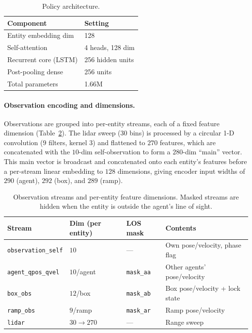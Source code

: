 \documentclass{article}
\begin{document}
\begin{table}[H]
  \centering
  \caption{Policy architecture.}
  \label{tab:arch}
  \begin{tabular}{ll}
    \toprule
    Component & Setting \\
    \midrule
    Entity embedding dim   & 128 \\
    Self-attention         & 4 heads, 128 dim \\
    Recurrent core (LSTM)  & 256 hidden units \\
    Post-pooling dense     & 256 units \\
    Total parameters       & 1.66M \\
    \bottomrule
  \end{tabular}
\end{table}

\paragraph{Observation encoding and dimensions.}
Observations are grouped into per-entity streams, each of a fixed feature
dimension (Table~\ref{tab:obsdims}). The lidar sweep ($30$ bins) is processed by
a circular 1-D convolution ($9$ filters, kernel $3$) and flattened to $270$
features, which are concatenated with the $10$-dim self-observation to form a
$280$-dim ``main'' vector. This main vector is broadcast and concatenated onto
each entity's features before a per-stream linear embedding to $128$ dimensions,
giving encoder input widths of $290$ (agent), $292$ (box), and $289$ (ramp).

\begin{table}[H]
  \centering
  \caption{Observation streams and per-entity feature dimensions. Masked streams
  are hidden when the entity is outside the agent's line of sight.}
  \label{tab:obsdims}
  \begin{tabular}{llll}
    \toprule
    Stream & Dim (per entity) & LOS mask & Contents \\
    \midrule
    \texttt{observation\_self} & $10$        & ---               & Own pose/velocity, phase flag \\
    \texttt{agent\_qpos\_qvel} & $10$/agent  & \texttt{mask\_aa} & Other agents' pose/velocity \\
    \texttt{box\_obs}          & $12$/box    & \texttt{mask\_ab} & Box pose/velocity + lock state \\
    \texttt{ramp\_obs}         & $9$/ramp    & \texttt{mask\_ar} & Ramp pose/velocity  \\
    \texttt{lidar}             & $30\to270$  & ---               & Range sweep  \\
    \bottomrule
  \end{tabular}
\end{table}
\end{document}
